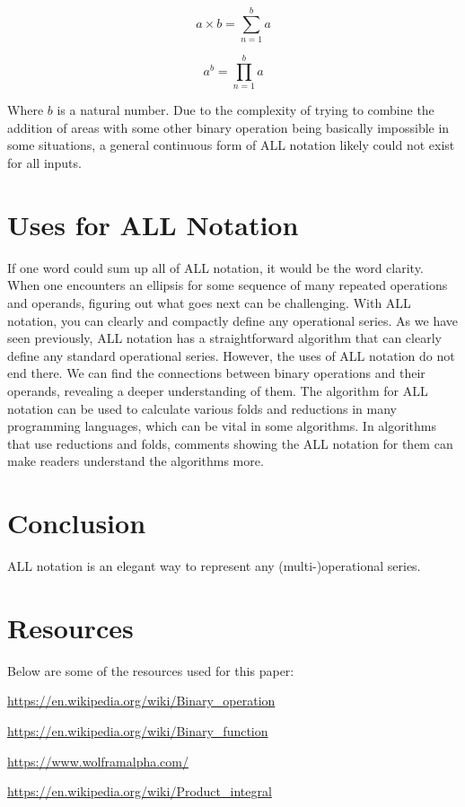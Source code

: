 \documentclass{article}
\begin{document}
$$a \times b = \sum_{n=1}^b a$$

$$a^b = \prod_{n=1}^b a$$

Where $b$ is a natural number. Due to the complexity of trying to combine the addition of areas with some other binary operation being basically impossible in some situations, a general continuous form of ALL notation likely could not exist for all inputs.

\section{Uses for ALL Notation}

If one word could sum up all of ALL notation, it would be the word clarity. When one encounters an ellipsis for some sequence of many repeated operations and operands, figuring out what goes next can be challenging. With ALL notation, you can clearly and compactly define any operational series. As we have seen previously, ALL notation has a straightforward algorithm that can clearly define any standard operational series. However, the uses of ALL notation do not end there. We can find the connections between binary operations and their operands, revealing a deeper understanding of them. The algorithm for ALL notation can be used to calculate various folds and reductions in many programming languages, which can be vital in some algorithms. In algorithms that use reductions and folds, comments showing the ALL notation for them can make readers understand the algorithms more.

\section{Conclusion}

ALL notation is an elegant way to represent any (multi-)operational series.

\section{Resources}


Below are some of the resources used for this paper:

\url{https://en.wikipedia.org/wiki/Binary_operation}

\url{https://en.wikipedia.org/wiki/Binary_function}

\url{https://www.wolframalpha.com/}

\url{https://en.wikipedia.org/wiki/Product_integral}
\end{document}

